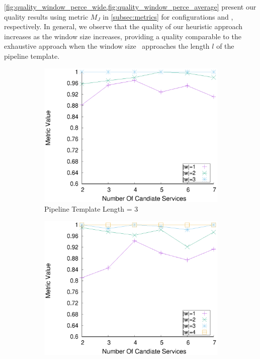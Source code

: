     {\color{OurColor2}\cref{fig:quality_window_perce_wide,fig:quality_window_perce_average} present} our quality results using metric $M_J$ in \cref{subsec:metrics} for configurations \wide and \average, respectively.
    In general, we observe that the quality of our heuristic approach increases as the window size increases, providing a quality comparable to the exhaustive approach when the window size \windowsize\ approaches the length $l$ of the pipeline template.
    \begin{figure}[ht!]
      \centering
      \begin{subfigure}{0.49\textwidth}
        \includegraphics[width=\textwidth]{Images/graphs/window_quality_performance_diff_perce_n7_s7_20_100_n3}
        \caption{Pipeline Template Length = 3}
        \label{fig:quality_window_wide_perce_n3}
      \end{subfigure}
      \hfill
      \begin{subfigure}{0.49\textwidth}
        \includegraphics[width=\textwidth]{Images/graphs/window_quality_performance_diff_perce_n7_s7_20_100_n4}

\end{subfigure}
\end{figure}
